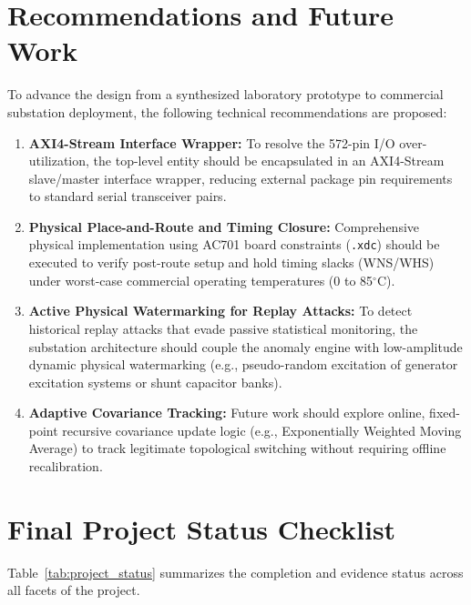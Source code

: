 \documentclass[11pt,a4paper]{report}
\begin{document}
\section{Recommendations and Future Work}
To advance the design from a synthesized laboratory prototype to commercial substation deployment,
the following technical recommendations are proposed:
\begin{enumerate}
    \item \textbf{AXI4-Stream Interface Wrapper:} To resolve the 572-pin I/O over-utilization,
    the top-level entity should be encapsulated in an AXI4-Stream slave/master interface wrapper,
    reducing external package pin requirements to standard serial transceiver pairs.
    \item \textbf{Physical Place-and-Route and Timing Closure:} Comprehensive physical implementation
    using AC701 board constraints (\texttt{.xdc}) should be executed to verify post-route setup and hold
    timing slacks (WNS/WHS) under worst-case commercial operating temperatures (0 to 85$^\circ$C).
    \item \textbf{Active Physical Watermarking for Replay Attacks:} To detect historical replay
    attacks that evade passive statistical monitoring, the substation architecture should
    couple the anomaly engine with low-amplitude dynamic physical watermarking (e.g., pseudo-random
    excitation of generator excitation systems or shunt capacitor banks).
    \item \textbf{Adaptive Covariance Tracking:} Future work should explore online, fixed-point
    recursive covariance update logic (e.g., Exponentially Weighted Moving Average) to track
    legitimate topological switching without requiring offline recalibration.
\end{enumerate}

\section{Final Project Status Checklist}
Table~\ref{tab:project_status} summarizes the completion and evidence status across all
facets of the project.
\end{document}
